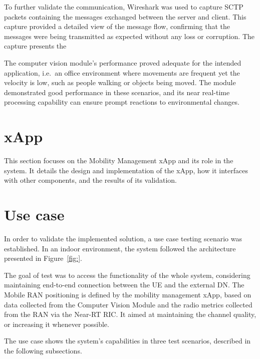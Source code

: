 To further validate the communication, Wireshark was used to capture SCTP packets containing the messages exchanged between the server and client.
This capture provided a detailed view of the message flow, confirming that the messages were being transmitted as expected without any loss or corruption.
The capture presents the





The computer vision module's performance proved adequate for the intended application, i.e.\ an office environment where movements are frequent yet the velocity is low, such as people walking or objects being moved.
The module demonstrated good performance in these scenarios, and its near real-time processing capability can ensure prompt reactions to environmental changes.



\section{xApp}\label{sec:mm_xapp}
This section focuses on the Mobility Management xApp and its role in the system.
It details the design and implementation of the xApp, how it interfaces with other components, and the results of its validation.

\section{Use case}\label{sec:use_case}
In order to validate the implemented solution, a use case testing scenario was established.
In an indoor environment, the system followed the architecture presented in Figure~\ref{fig:}.



The goal of test was to access the functionality of the whole system, considering maintaining end-to-end connection between the UE and the external DN. The Mobile RAN positioning is defined by the mobility management xApp, based on data collected from the Computer Vision Module and the radio metrics collected from the RAN via the Near-RT RIC. It aimed at maintaining the channel quality, or increasing it whenever possible.

The use case shows the system's capabilities in three test scenarios, described in the following subsections.

